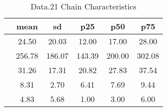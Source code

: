 \begin{table}[htbp]
\caption{\label{clabel} Data.21 Chain Characteristics}\centering\medskip
\begin{tabular}{lccccc} \hline \hline
 & mean  & sd  & p25  & p50  & p75  \\  \hline 
 &        24.50 &        20.03 &        12.00 &        17.00 &        28.00 \\  
 &       256.78 &       186.07 &       143.39 &       200.00 &       302.08 \\  
 &        31.26 &        17.31 &        20.82 &        27.83 &        37.54 \\  
 &         8.31 &         2.70 &         6.41 &         7.69 &         9.44 \\  
 &         4.83 &         5.68 &         1.00 &         3.00 &         6.00 \\  
\hline \hline \end{tabular}
\end{table}
